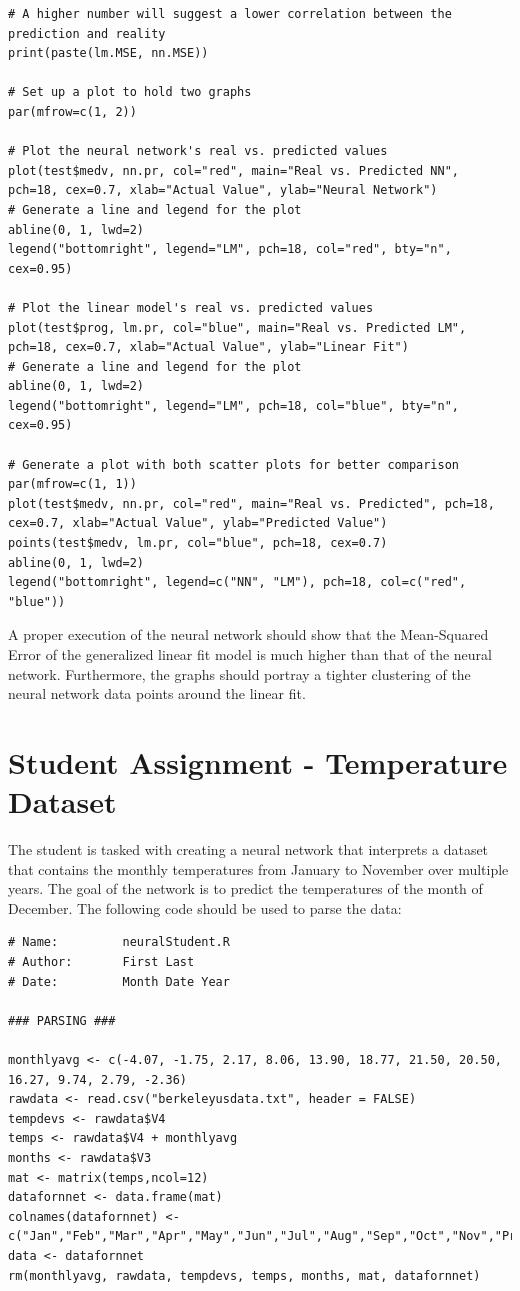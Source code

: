 \begin{lstlisting}
# A higher number will suggest a lower correlation between the prediction and reality
print(paste(lm.MSE, nn.MSE))

# Set up a plot to hold two graphs
par(mfrow=c(1, 2))

# Plot the neural network's real vs. predicted values
plot(test$medv, nn.pr, col="red", main="Real vs. Predicted NN", pch=18, cex=0.7, xlab="Actual Value", ylab="Neural Network")
# Generate a line and legend for the plot
abline(0, 1, lwd=2)
legend("bottomright", legend="LM", pch=18, col="red", bty="n", cex=0.95)

# Plot the linear model's real vs. predicted values
plot(test$prog, lm.pr, col="blue", main="Real vs. Predicted LM", pch=18, cex=0.7, xlab="Actual Value", ylab="Linear Fit")
# Generate a line and legend for the plot
abline(0, 1, lwd=2)
legend("bottomright", legend="LM", pch=18, col="blue", bty="n", cex=0.95)

# Generate a plot with both scatter plots for better comparison
par(mfrow=c(1, 1))
plot(test$medv, nn.pr, col="red", main="Real vs. Predicted", pch=18, cex=0.7, xlab="Actual Value", ylab="Predicted Value")
points(test$medv, lm.pr, col="blue", pch=18, cex=0.7)
abline(0, 1, lwd=2)
legend("bottomright", legend=c("NN", "LM"), pch=18, col=c("red", "blue"))
\end{lstlisting}

A proper execution of the neural network should show that the Mean-Squared Error of the generalized linear fit model is much higher than that of the neural network. Furthermore, the graphs should portray a tighter clustering of the neural network data points around the linear fit. 

\section{Student Assignment - Temperature Dataset} 

The student is tasked with creating a neural network that interprets a dataset that contains the monthly temperatures from January to November over multiple years. The goal of the network is to predict the temperatures of the month of December. The following code should be used to parse the data:

\begin{lstlisting}
# Name:         neuralStudent.R
# Author:       First Last
# Date:         Month Date Year

### PARSING ###

monthlyavg <- c(-4.07, -1.75, 2.17, 8.06, 13.90, 18.77, 21.50, 20.50, 16.27, 9.74, 2.79, -2.36)
rawdata <- read.csv("berkeleyusdata.txt", header = FALSE)
tempdevs <- rawdata$V4
temps <- rawdata$V4 + monthlyavg
months <- rawdata$V3
mat <- matrix(temps,ncol=12)
datafornnet <- data.frame(mat)
colnames(datafornnet) <- c("Jan","Feb","Mar","Apr","May","Jun","Jul","Aug","Sep","Oct","Nov","Prog")
data <- datafornnet
rm(monthlyavg, rawdata, tempdevs, temps, months, mat, datafornnet)
\end{lstlisting}

